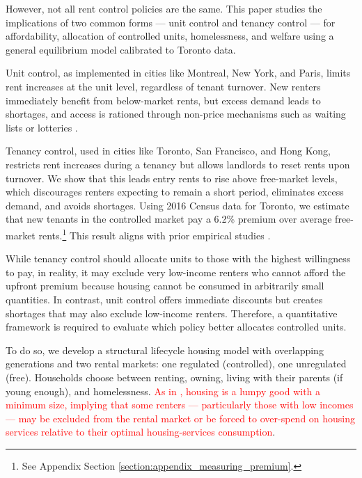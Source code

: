 \documentclass[parskip=full]{article}
\begin{document}
However, not all rent control policies are the same. This paper studies the implications of two common forms — unit control and tenancy control — for affordability, allocation of controlled units, homelessness, and welfare using a general equilibrium model calibrated to Toronto data.

Unit control, as implemented in cities like Montreal, New York, and Paris, limits rent increases at the unit level, regardless of tenant turnover. New renters immediately benefit from below-market rents, but excess demand leads to shortages, and access is rationed through non-price mechanisms such as waiting lists or lotteries \citep{gl-2003}.

Tenancy control, used in cities like Toronto, San Francisco, and Hong Kong, restricts rent increases during a tenancy but allows landlords to reset rents upon turnover. We show that this leads entry rents to rise above free-market levels, which discourages renters expecting to remain a short period, eliminates excess demand, and avoids shortages. Using 2016 Census data for Toronto, we estimate that new tenants in the controlled market pay a 6.2\% premium over average free-market rents.\footnote{See Appendix Section \ref{section:appendix_measuring_premium}.} This result aligns with prior empirical studies \citep{nagy-1997,early-2000,cjq-2023}.

While tenancy control should allocate units to those with the highest willingness to pay, in reality, it may exclude very low-income renters who cannot afford the upfront premium because housing cannot be consumed in arbitrarily small quantities. In contrast, unit control offers immediate discounts but creates shortages that may also exclude low-income renters. Therefore, a quantitative framework is required to evaluate which policy better allocates controlled units.

To do so, we develop a structural lifecycle housing model with overlapping generations and two rental markets: one regulated (controlled), one unregulated (free). Households choose between renting, owning, living with their parents (if young enough), and homelessness. \textcolor{red}{As in \citet{rs-2023}, housing is a lumpy good with a minimum size, implying that some renters — particularly those with low incomes — may be excluded from the rental market or be forced to over-spend on housing services relative to their optimal housing-services consumption}. 
\end{document}

